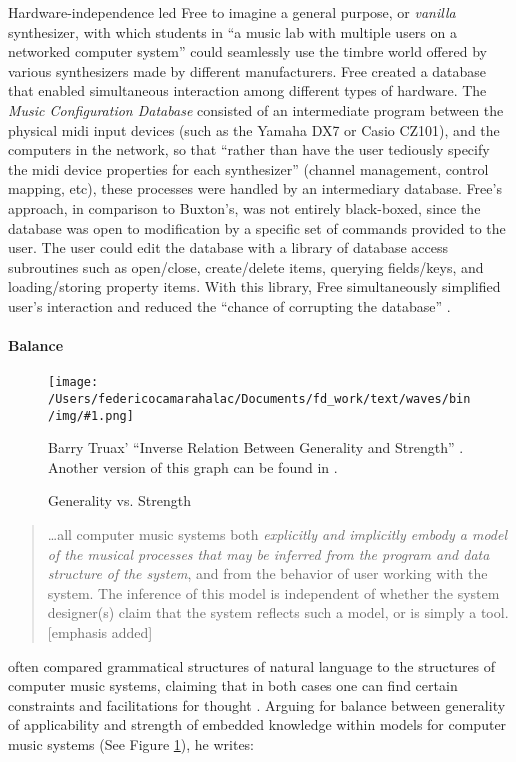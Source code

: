 \documentclass[
]{book}
\newcommand{\fsee}[1]{(See Figure \ref{img:#1})}
\newcommand{\im}[0]{[emphasis added] }
\newcommand{\img}[4]{
\begin{figure}[!htbp]
\centering
\texttt{[image: /Users/federicocamarahalac/Documents/fd\_work/text/waves/bin/img/\#1.png]}
\caption{#4}
\label{img:#1}
#3
\end{figure}
\FloatBarrier
}
\begin{document}
Hardware-independence led Free to imagine a general purpose, or \textit{vanilla} synthesizer, with which students in ``a music lab with multiple users on a networked computer system'' \parencite[127]{DBLP:conf/icmc/FreeV88} could seamlessly use the timbre world offered by various synthesizers made by different manufacturers. Free created a database that enabled simultaneous interaction among different types of hardware. The \textit{Music Configuration Database} consisted of an intermediate program between the physical \gls{midi} input devices (such as the Yamaha DX7 or Casio CZ101), and the computers in the network, so that ``rather than have the user tediously specify the \gls{midi} device properties for each synthesizer'' \parencite[133]{DBLP:conf/icmc/FreeV88} (channel management, control mapping, etc), these processes were handled by an intermediary database. Free's approach, in comparison to Buxton's, was not entirely black-boxed, since the database was open to modification by a specific set of commands provided to the user. The user could edit the database with a library of database access subroutines such as open/close, create/delete items, querying fields/keys, and loading/storing property items. With this library, Free simultaneously simplified user's interaction and reduced the ``chance of corrupting the database'' \parencite[137]{DBLP:conf/icmc/FreeV88}. 

\paragraph{Balance}
\label{computer:balance}

\img{truax_generality_b}{0.7}{
	Barry Truax' ``Inverse Relation Between Generality and Strength'' \parencite[51]{Tru80:The}. Another version of this graph can be found in \parencite[38]{laske_otto_1999}.
}{Generality vs. Strength}

\begin{quote}
	\dots all computer music systems both \textit{explicitly and implicitly embody a model of the musical processes that may be inferred from the program and data structure of the system}, and from the behavior of user working with the system. The inference of this model is independent of whether the system designer(s) claim that the system reflects such a model, or is simply a tool. \im \parencite[230-231]{Tru76:ACo}
\end{quote}

\textcites{Tru73:The}{Tru76:ACo}{Tru80:The}[Chapter~8]{Emm86:The} often compared grammatical structures of natural language to the structures of computer music systems, claiming that in both cases one can find certain constraints and facilitations for thought \parencite[156]{Emm86:The}. Arguing for balance between generality of applicability and strength of embedded knowledge within models for computer music systems \fsee{truax_generality_b}, he writes:
\end{document}
